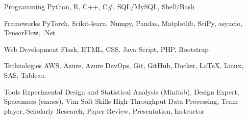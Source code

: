 

\begin{cvskills}


\cvskill
    {Programming} %
    {Python, R, C++, C\#, SQL/MySQL, Shell/Bash} %


\cvskill
    {Frameworks} %
    {PyTorch, Scikit-learn, Numpy, Pandas, Matplotlib, SciPy, asyncio, TensorFlow, .Net} %


\cvskill
    {Web Development} %
    {Flask, HTML, CSS, Java Script, PHP, Bootstrap} %
    

\cvskill
    {Technologies} %
    {AWS, Azure, Azure DevOps, Git, GitHub, Docker, LaTeX, Linux, SAS, Tableau} %
    



\cvskill
    {Tools}
    { Experimental Design and Statistical Analysis (Minitab), Design Expert, Spacemacs (emacs), Vim}
\vspace{0.3cm}
\cvskill
    {Soft Skills} %
    {High-Throughput Data Processing, Team player, Scholarly Research, Paper Review, Presentation, Instructor} %




\end{cvskills}
